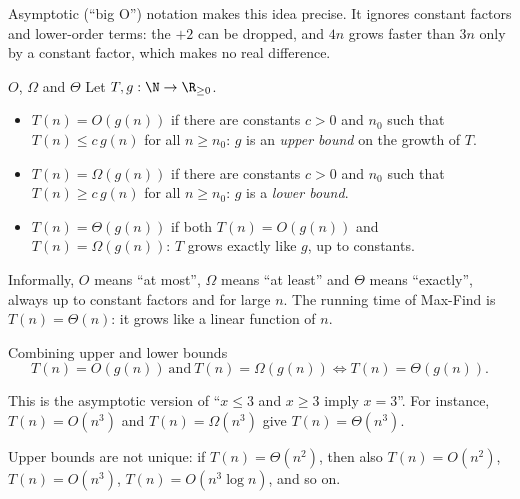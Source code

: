 \documentclass[a4paper,12pt,oneside]{report}
\begin{document}
Asymptotic (``big O'') notation makes this idea precise. It ignores
constant factors and lower-order terms: the $+2$ can be dropped, and
$4n$ grows faster than $3n$ only by a constant factor, which makes no
real difference.

\begin{frameddefn}{$O$, $\Omega$ and $\Theta$}\label{def:asymptotic}
Let $T,g:\N\to\R_{\geq0}$.
\begin{itemize}
  \item $T(n)=O(g(n))$ if there are constants $c>0$ and $n_0$ such
    that $T(n)\leq c\,g(n)$ for all $n\geq n_0$:
    $g$ is an \emph{upper bound} on the growth of $T$.
  \item $T(n)=\Omega(g(n))$ if there are constants $c>0$ and $n_0$
    such that $T(n)\geq c\,g(n)$ for all $n\geq n_0$:
    $g$ is a \emph{lower bound}.
  \item $T(n)=\Theta(g(n))$ if both $T(n)=O(g(n))$ and
    $T(n)=\Omega(g(n))$: $T$ grows exactly like $g$, up to constants.
\end{itemize}
\end{frameddefn}

Informally, $O$ means ``at most'', $\Omega$ means ``at least'' and
$\Theta$ means ``exactly'', always up to constant factors and for large
$n$. The running time of Max-Find is $T(n)=\Theta(n)$: it grows like a
linear function of $n$.

\begin{framedprop}{Combining upper and lower bounds}
\label{prop:theta-from-bounds}
\[
  T(n)=O(g(n))\ \text{and}\ T(n)=\Omega(g(n))
  \iff T(n)=\Theta(g(n)).
\]
\end{framedprop}

This is the asymptotic version of ``$x\leq3$ and $x\geq3$ imply
$x=3$''. For instance, $T(n)=O(n^3)$ and $T(n)=\Omega(n^3)$ give
$T(n)=\Theta(n^3)$.

Upper bounds are not unique: if $T(n)=\Theta(n^2)$, then also
$T(n)=O(n^2)$, $T(n)=O(n^3)$, $T(n)=O(n^3\log n)$, and so on.
\end{document}
